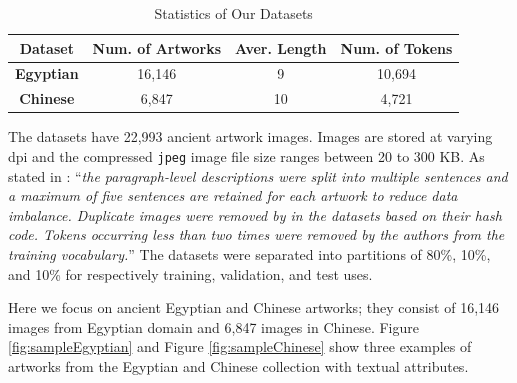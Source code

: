 \begin{table}[h!]
\centering
\begin{tabular}{|c|c|c|c|}
\hline
\textbf{Dataset}          & \textbf{Num. of Artworks} & \textbf{Aver. Length} & \textbf{Num. of Tokens} \\ \hline
\textbf{Egyptian} & 16,146                       & 9                       & 10,694                     \\ \hline
\textbf{Chinese}  & 6,847                        & 10                      & 4,721                      \\ \hline
\end{tabular}
\caption{Statistics of Our Datasets \cite{artworkcaption}}
\label{fig:datasetstats}
\end{table}

The datasets have 22,993 ancient artwork images. Images are stored at varying dpi and the
compressed \verb|jpeg| image file size ranges between 20 to 300 KB. As stated in \cite{artworkcaption}: ``\textit{the paragraph-level descriptions were split into multiple sentences and a maximum of five sentences are retained for each artwork to reduce data imbalance. Duplicate images were removed by \cite{artworkcaption} in the datasets based on their hash code. Tokens occurring less than two times were removed by the authors from the training vocabulary.}''
The datasets were separated into partitions of 80\%, 10\%, and 10\% for respectively training, validation, and test uses.


Here we focus on ancient Egyptian and Chinese artworks; 
they consist of 16,146 images from Egyptian domain and 6,847 images in Chinese. Figure \ref{fig:sampleEgyptian} and Figure \ref{fig:sampleChinese} show three examples of artworks from the Egyptian and Chinese collection with textual attributes.

